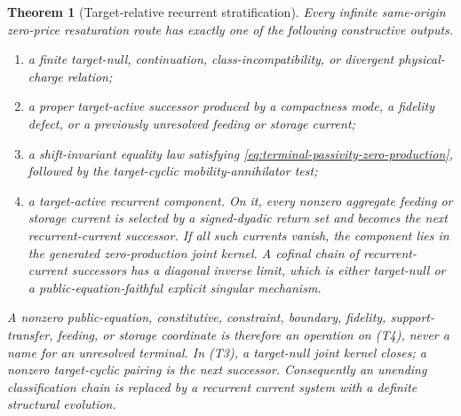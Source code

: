 \documentclass[11pt]{article}
\numberwithin{section}{part}
\theoremstyle{plain}
\newtheorem{theorem}{Theorem}[section]
\theoremstyle{definition}
\theoremstyle{remark}
\begin{document}
\begin{theorem}[Target-relative recurrent stratification]
\label{thm:target-relative-terminal-stratification}
Every infinite same-origin zero-price resaturation route has exactly one of
the following constructive outputs.
\begin{enumerate}[label=\textup{(T\arabic*)}]
\item a finite target-null, continuation, class-incompatibility, or divergent
physical-charge relation;
\item a proper target-active successor produced by a compactness mode, a
fidelity defect, or a previously unresolved feeding or storage current;
\item a shift-invariant equality law satisfying
\eqref{eq:terminal-passivity-zero-production}, followed by the
target-cyclic mobility-annihilator test;
\item a target-active recurrent component.  On it, every nonzero aggregate
feeding or storage current is selected by a signed-dyadic return set and
becomes the next recurrent-current successor.  If all such currents vanish,
the component lies in the generated zero-production joint kernel.  A cofinal
chain of recurrent-current successors has a diagonal inverse limit, which is
either target-null or a public-equation-faithful explicit singular mechanism.
\end{enumerate}
A nonzero public-equation, constitutive, constraint, boundary, fidelity,
support-transfer, feeding, or storage coordinate is therefore an operation
on \textup{(T4)}, never a name for an unresolved terminal.  In
\textup{(T3)}, a target-null joint kernel closes; a nonzero target-cyclic
pairing is the next successor.  Consequently an unending classification
chain is replaced by a recurrent current system with a definite structural
evolution.
\end{theorem}
\end{document}
